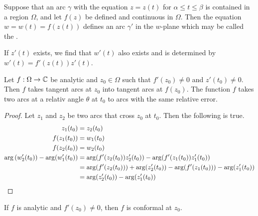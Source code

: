 \begin{definition}
    Suppose that an arc $\gamma$ with the equation $z=z(t)$ for $\alpha \leq t \leq \beta$
    is contained in a region $\Omega$, and let $f(z)$ be defined and continuous in
    $\Omega$. Then the equation $w=w(t)=f(z(t))$ defines an arc $\gamma'$ in the
    $w$-plane which may be called the .
\end{definition}

\begin{theorem}
    If $z'(t)$ exists, we find that $w'(t)$ also exists and is determined by
    $w'(t) = f'(z(t)) z'(t)$.
\end{theorem}

\begin{theorem}
    Let $f: \Omega \rightarrow \mathbb{C}$ be analytic and $z_0 \in \Omega$ such that $f'(z_0)
    \neq 0$ and $z'(t_0) \neq 0$. Then $f$ takes tangent arcs at $z_0$ into tangent
    arcs at $f(z_0)$. The function $f$ takes two arcs at a relativ angle $\theta$ at
    $t_0$ to arcs with the same relative error.

    \begin{proof}
        Let $z_1$ and $z_2$ be two arcs that cross $z_0$ at $t_0$. Then the following
        is true.
        \begin{align*}
            z_1(t_0) &= z_2(t_0)
            \\
            f(z_1(t_0)) &= w_1(t_0)
            \\
            f(z_2(t_0)) &= w_2(t_0)
            \\
            \arg \left( w_2'(t_0) \right) - \arg(w_1'(t_0)) &=
            \arg(f'(z_2(t_0)) z_2'(t_0)) - \arg(f'(z_1(t_0)) z_1'(t_0))
            \\
            &= \arg(f'(z_2(t_0))) + \arg(z_2'(t_0)) - \arg(f'(z_1(t_0)))
                - \arg(z_1'(t_0))
            \\
            &= \arg(z_2'(t_0)) - \arg(z_1'(t_0))
        \end{align*}
    \end{proof}
\end{theorem}

\begin{theorem}
    If $f$ is analytic and $f'(z_0) \neq 0$, then $f$ is conformal at $z_0$. 
\end{theorem}
